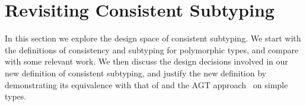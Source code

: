 \section{Revisiting Consistent Subtyping}
\label{sec:exploration}

In this section we explore the design space of consistent subtyping.
We start with the definitions of consistency and subtyping for
polymorphic types, and compare with some relevant work.
We then discuss the design decisions
involved in our new definition of consistent subtyping, and justify the new
definition by demonstrating its equivalence with that of \citet{siek2007gradual}
and the AGT approach~\citep{garcia2016abstracting} on simple types.




